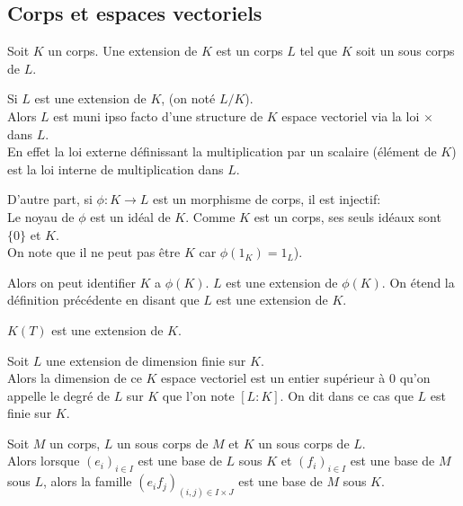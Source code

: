 \subsection{Corps et espaces vectoriels}


\begin{definition}
	Soit $K$ un corps. Une extension de $K$ est un corps $L$ tel que $K$ soit un sous corps de $L$.
\end{definition}


\begin{remarque}
	Si $L$ est une extension de $K$, (on noté $L/K$).\\
	Alors $L$ est muni ipso facto d'une structure de $K$ espace vectoriel via la loi $\times$ dans $L$.\\
	En effet la loi externe définissant la multiplication par un scalaire (élément de $K$) est la loi interne de multiplication dans $L$.

	D'autre part, si $\phi : K \to L$ est un morphisme de corps, il est injectif: \\
	Le noyau de $\phi$ est un idéal de $K$. Comme $K$ est un corps, ses seuls idéaux sont $\{0\}$ et $K$.\\
	On note que il ne peut pas être $K$ car $\phi(1_K) = 1_L$).

	Alors on peut identifier $K$ a $\phi(K)$. $L$ est une extension de $\phi(K)$. On étend la définition précédente en disant que $L$ est une extension de $K$.
\end{remarque}

\begin{example}
	$K(T)$ est une extension de $K$.
\end{example}

\begin{definition}
	Soit $L$ une extension de dimension finie sur $K$.\\
	Alors la dimension de ce $K$ espace vectoriel est un entier supérieur à 0 qu'on appelle
	le degré de $L$ sur $K$ que l'on note $[L : K]$. On dit dans ce cas que $L$ est finie sur $K$.
\end{definition}

\begin{theorem}
	Soit $M$ un corps, $L$ un sous corps de $M$ et $K$ un sous corps de $L$.\\
	Alors lorsque $(e_i)_{i\in I}$ est une base de $L$ sous $K$ et $(f_i)_{i\in I}$ est une base de $M$ sous $L$, alors la famille
	$(e_if_j)_{(i,j)\in I\times J}$ est une base de $M$ sous $K$.
\end{theorem}


